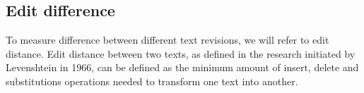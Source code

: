 \documentclass[a4paper,11pt,twoside,notitlepage]{article}
\begin{document}



        \subsection{Edit difference}
        To measure difference between different text revisions, we
        will refer to edit distance. Edit distance between two texts,
        as defined in the research initiated by Levenshtein in
        1966,\cite{Levenshtein1966} can be defined as the minimum
        amount of insert, delete and substitutions operations needed
        to transform one text into another.
\end{document}
